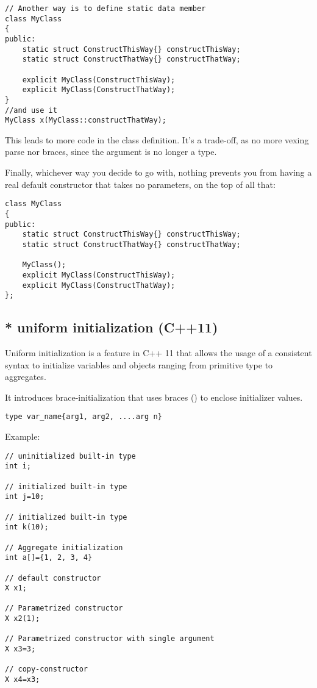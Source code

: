 \begin{lstlisting}
// Another way is to define static data member
class MyClass
{
public:
    static struct ConstructThisWay{} constructThisWay;
    static struct ConstructThatWay{} constructThatWay;
 
    explicit MyClass(ConstructThisWay);
    explicit MyClass(ConstructThatWay);
}
//and use it
MyClass x(MyClass::constructThatWay);
\end{lstlisting}
This leads to more code in the class definition. It’s a trade-off, as no more
vexing parse nor braces, since the argument is no longer a type.

Finally, whichever way you decide to go with, nothing prevents you from having a
real default constructor that takes no parameters, on the top of all that:
\begin{verbatim}
class MyClass
{
public:
    static struct ConstructThisWay{} constructThisWay;
    static struct ConstructThatWay{} constructThatWay;
 
    MyClass();
    explicit MyClass(ConstructThisWay);
    explicit MyClass(ConstructThatWay);
};
\end{verbatim}


\subsection{* uniform initialization (C++11)}
\label{sec:uniform-initialization-C++11}

Uniform initialization is a feature in C++ 11 that allows the usage of a
consistent syntax to initialize variables and objects ranging from primitive
type to aggregates.

It introduces brace-initialization that uses braces ({}) to enclose initializer
values.
\begin{verbatim}
type var_name{arg1, arg2, ....arg n}
\end{verbatim}


Example:
\begin{lstlisting}
// uninitialized built-in type
int i;    

// initialized built-in type
int j=10; 

// initialized built-in type
int k(10);

// Aggregate initialization
int a[]={1, 2, 3, 4} 

// default constructor
X x1; 

// Parametrized constructor
X x2(1); 

// Parametrized constructor with single argument
X x3=3; 

// copy-constructor
X x4=x3; 
\end{lstlisting}

